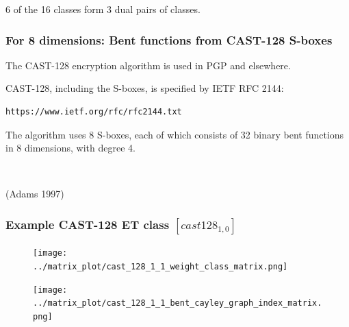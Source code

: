 \documentclass[pdf,sprung,slideColor,nocolorBG]{beamer}
\newenvironment{colortheme}[1]{
\def\ProvidesPackageRCS $##1${\relax}
\renewcommand{\ProcessOptions}{\relax}
\makeatletter

\makeatother
}{}
\newcommand{\slidecite}[1]{\tiny{(#1)}\normalsize{}}
\begin{document}
\begin{colortheme}{jubata}
\begin{frame}
\begin{figure}
\begin{minipage}{.48\textwidth}
  \label{fig:psf_9_5438_dual_cayley_graph_index_matrix}
\end{minipage}%
\end{figure}
6 of the 16 classes form 3 dual pairs of classes.
\end{frame}
\begin{colortheme}{seagull}
\begin{frame}[fragile]
\frametitle{For 8 dimensions: Bent functions from CAST-128 S-boxes}

The CAST-128 encryption algorithm is used in PGP and elsewhere.

CAST-128, including the S-boxes, is specified by IETF RFC 2144:
\begin{verbatim}
https://www.ietf.org/rfc/rfc2144.txt
\end{verbatim}

The algorithm uses 8 S-boxes, each of which consists of 32 binary bent functions in 8 dimensions,
with degree 4.

~

\slidecite{Adams 1997}
\end{frame}
\end{colortheme}
\begin{frame}
\frametitle{Example CAST-128 ET class $[cast128_{1,0}]$}
\begin{figure}
\centering
\begin{minipage}{.48\textwidth}
  \centering

\texttt{[image: ../matrix\_plot/cast\_128\_1\_1\_weight\_class\_matrix.png]}
  \label{fig:cast128_1_1_weight_class_matrix}
\end{minipage}
\begin{minipage}{.48\textwidth}
  \centering
\texttt{[image: ../matrix\_plot/cast\_128\_1\_1\_bent\_cayley\_graph\_index\_matrix.png]}
  \label{fig:cast_128_1_1_bent_cayley_graph_index_matrix}
\end{minipage}%
\end{figure}
\end{frame}

\end{colortheme}
\end{document}
